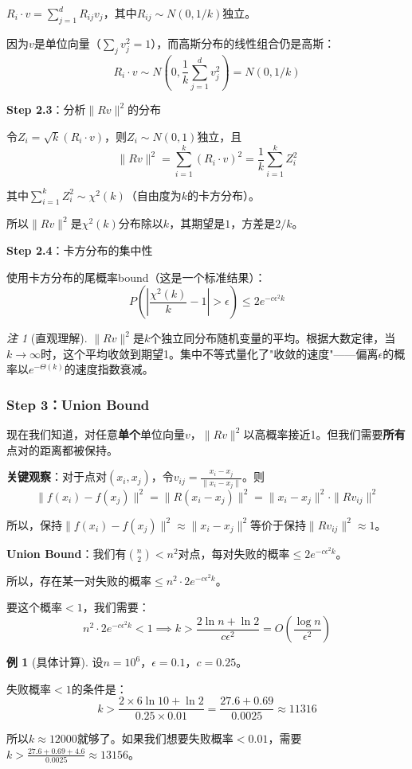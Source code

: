 \documentclass[11pt,a4paper]{ctexart}
\theoremstyle{definition}
\newtheorem{example}[theorem]{例}
\theoremstyle{remark}
\newtheorem{remark}[theorem]{注}
\begin{document}
$R_i \cdot v = \sum_{j=1}^d R_{ij} v_j$，其中$R_{ij} \sim N(0, 1/k)$独立。

因为$v$是单位向量（$\sum_j v_j^2 = 1$），而高斯分布的线性组合仍是高斯：
\[
R_i \cdot v \sim N\left(0, \frac{1}{k}\sum_{j=1}^d v_j^2\right) = N(0, 1/k)
\]

\textbf{Step 2.3}：分析$\|Rv\|^2$的分布

令$Z_i = \sqrt{k}(R_i \cdot v)$，则$Z_i \sim N(0, 1)$独立，且
\[
\|Rv\|^2 = \sum_{i=1}^k (R_i \cdot v)^2 = \frac{1}{k}\sum_{i=1}^k Z_i^2
\]

其中$\sum_{i=1}^k Z_i^2 \sim \chi^2(k)$（自由度为$k$的卡方分布）。

所以$\|Rv\|^2$是$\chi^2(k)$分布除以$k$，其期望是$1$，方差是$2/k$。

\textbf{Step 2.4}：卡方分布的集中性

使用卡方分布的尾概率bound（这是一个标准结果）：
\[
P\left(\left|\frac{\chi^2(k)}{k} - 1\right| > \epsilon\right) \leq 2e^{-c\epsilon^2 k}
\]

\begin{remark}[直观理解]
$\|Rv\|^2$是$k$个独立同分布随机变量的平均。根据大数定律，当$k \to \infty$时，这个平均收敛到期望1。集中不等式量化了"收敛的速度"——偏离$\epsilon$的概率以$e^{-\Theta(k)}$的速度指数衰减。
\end{remark}

\subsubsection{Step 3：Union Bound}

现在我们知道，对任意\textbf{单个}单位向量$v$，$\|Rv\|^2$以高概率接近1。但我们需要\textbf{所有}点对的距离都被保持。

\textbf{关键观察}：对于点对$(x_i, x_j)$，令$v_{ij} = \frac{x_i - x_j}{\|x_i - x_j\|}$。则
\[
\|f(x_i) - f(x_j)\|^2 = \|R(x_i - x_j)\|^2 = \|x_i - x_j\|^2 \cdot \|Rv_{ij}\|^2
\]

所以，保持$\|f(x_i) - f(x_j)\|^2 \approx \|x_i - x_j\|^2$等价于保持$\|Rv_{ij}\|^2 \approx 1$。

\textbf{Union Bound}：我们有$\binom{n}{2} < n^2$对点，每对失败的概率$\leq 2e^{-c\epsilon^2 k}$。

所以，存在某一对失败的概率$\leq n^2 \cdot 2e^{-c\epsilon^2 k}$。

要这个概率$< 1$，我们需要：
\[
n^2 \cdot 2e^{-c\epsilon^2 k} < 1 \implies k > \frac{2\ln n + \ln 2}{c\epsilon^2} = O\left(\frac{\log n}{\epsilon^2}\right)
\]

\begin{example}[具体计算]
设$n = 10^6$，$\epsilon = 0.1$，$c = 0.25$。

失败概率$< 1$的条件是：
\[
k > \frac{2 \times 6 \ln 10 + \ln 2}{0.25 \times 0.01} = \frac{27.6 + 0.69}{0.0025} \approx 11316
\]

所以$k \approx 12000$就够了。如果我们想要失败概率$< 0.01$，需要$k > \frac{27.6 + 0.69 + 4.6}{0.0025} \approx 13156$。
\end{example}
\end{document}
